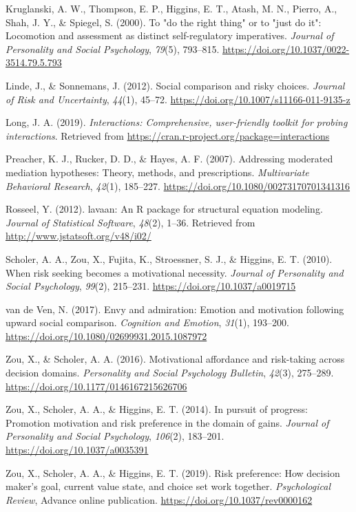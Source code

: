 \documentclass[man,floatsintext]{apa6}
\begin{document}
\leavevmode\hypertarget{ref-kruglanskietal2000}{}%
Kruglanski, A. W., Thompson, E. P., Higgins, E. T., Atash, M. N., Pierro, A., Shah, J. Y., \& Spiegel, S. (2000). To "do the right thing" or to "just do it": Locomotion and assessment as distinct self-regulatory imperatives. \emph{Journal of Personality and Social Psychology}, \emph{79}(5), 793--815. \url{https://doi.org/10.1037/0022-3514.79.5.793}

\leavevmode\hypertarget{ref-lindesonnemans2012}{}%
Linde, J., \& Sonnemans, J. (2012). Social comparison and risky choices. \emph{Journal of Risk and Uncertainty}, \emph{44}(1), 45--72. \url{https://doi.org/10.1007/s11166-011-9135-z}

\leavevmode\hypertarget{ref-R-interactions}{}%
Long, J. A. (2019). \emph{Interactions: Comprehensive, user-friendly toolkit for probing interactions}. Retrieved from \url{https://cran.r-project.org/package=interactions}

\leavevmode\hypertarget{ref-preacheretal2007}{}%
Preacher, K. J., Rucker, D. D., \& Hayes, A. F. (2007). Addressing moderated mediation hypotheses: Theory, methods, and prescriptions. \emph{Multivariate Behavioral Research}, \emph{42}(1), 185--227. \url{https://doi.org/10.1080/00273170701341316}

\leavevmode\hypertarget{ref-R-lavaan}{}%
Rosseel, Y. (2012). lavaan: An R package for structural equation modeling. \emph{Journal of Statistical Software}, \emph{48}(2), 1--36. Retrieved from \url{http://www.jstatsoft.org/v48/i02/}

\leavevmode\hypertarget{ref-scholeretal2010}{}%
Scholer, A. A., Zou, X., Fujita, K., Stroessner, S. J., \& Higgins, E. T. (2010). When risk seeking becomes a motivational necessity. \emph{Journal of Personality and Social Psychology}, \emph{99}(2), 215--231. \url{https://doi.org/10.1037/a0019715}

\leavevmode\hypertarget{ref-vandeven2017}{}%
van de Ven, N. (2017). Envy and admiration: Emotion and motivation following upward social comparison. \emph{Cognition and Emotion}, \emph{31}(1), 193--200. \url{https://doi.org/10.1080/02699931.2015.1087972}

\leavevmode\hypertarget{ref-zouscholer2016}{}%
Zou, X., \& Scholer, A. A. (2016). Motivational affordance and risk-taking across decision domains. \emph{Personality and Social Psychology Bulletin}, \emph{42}(3), 275--289. \url{https://doi.org/10.1177/0146167215626706}

\leavevmode\hypertarget{ref-zouetal2014}{}%
Zou, X., Scholer, A. A., \& Higgins, E. T. (2014). In pursuit of progress: Promotion motivation and risk preference in the domain of gains. \emph{Journal of Personality and Social Psychology}, \emph{106}(2), 183--201. \url{https://doi.org/10.1037/a0035391}

\leavevmode\hypertarget{ref-zouetal2019}{}%
Zou, X., Scholer, A. A., \& Higgins, E. T. (2019). Risk preference: How decision maker's goal, current value state, and choice set work together. \emph{Psychological Review}, Advance online publication. \url{https://doi.org/10.1037/rev0000162}

\endgroup
\end{document}
